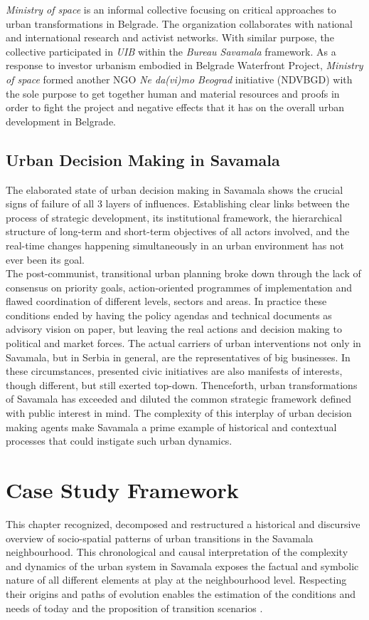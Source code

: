 \documentclass[11pt]{report}
\begin{document}
\textit{Ministry of space} is an informal collective focusing on critical approaches to urban transformations in Belgrade. The organization collaborates with national and international research and activist networks.  With similar purpose, the collective participated in \textit{UIB} within the \textit{Bureau Savamala} framework. As a response to investor urbanism embodied in Belgrade Waterfront Project, \textit{Ministry of space} formed another NGO \textit{Ne da(vi)mo Beograd} initiative (NDVBGD) with the sole purpose to get together human and material resources and proofs in order to fight the project and negative effects that it has on the overall urban development in Belgrade.

\subsection{Urban Decision Making in Savamala}
The elaborated state of urban decision making in Savamala shows the crucial signs of failure of all 3 layers of influences.
Establishing clear links between the process of strategic development, its institutional framework, the hierarchical structure of long-term and short-term objectives of all actors involved, and the real-time changes happening simultaneously in an urban environment has not ever been its goal.
\\
The post-communist, transitional urban planning broke down through the lack of consensus on priority goals, action-oriented programmes of implementation and flawed coordination of different levels, sectors and areas. In practice these conditions ended by having the policy agendas and technical documents as advisory vision on paper, but leaving the real actions and decision making to political and market forces.
The actual carriers of urban interventions not only in Savamala, but in Serbia in general, are the representatives of big businesses.
In these circumstances, presented civic initiatives are also manifests of interests, though different, but still exerted top-down. 
Thenceforth, urban transformations of Savamala has exceeded and diluted the common strategic framework defined with public interest in mind. The complexity of this interplay of urban decision making agents make Savamala a prime example of historical and contextual processes that could instigate such urban dynamics.

\section{Case Study Framework}
This chapter recognized, decomposed and restructured a historical and discursive overview of socio-spatial patterns of urban transitions in the Savamala neighbourhood.
This chronological and causal interpretation of the complexity and dynamics of the urban system in Savamala exposes the factual and symbolic nature of all different elements at play at the neighbourhood level.
Respecting their origins and paths of evolution enables the estimation of the 
conditions and needs of today and the proposition of transition scenarios \cite{(Grozdanic)}.
\end{document}
